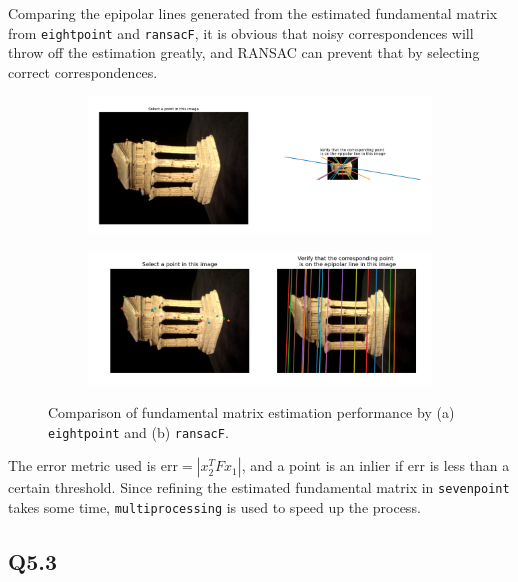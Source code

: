 \documentclass{article} %
\begin{document}
    Comparing the epipolar lines generated from the estimated fundamental matrix from \verb|eightpoint| and \verb|ransacF|, it is obvious that noisy correspondences will throw off the estimation greatly, and RANSAC can prevent that by selecting correct correspondences.
    \smallskip

    \begin{figure}[h]
        \begin{subfigure}[b]{0.5\textwidth}
            \includegraphics[width=\textwidth]{q5,1 eightpoint.png}
            \subcaption{}
        \end{subfigure}
        \begin{subfigure}[b]{0.5\textwidth}
            \includegraphics[width=\textwidth]{q5,1 ransac.png}
            \subcaption{}
        \end{subfigure}
        \caption{Comparison of fundamental matrix estimation performance by (a) \texttt{eightpoint} and (b) \texttt{ransacF}.}
    \end{figure}
    
    The error metric used is $\text{err}=|x_2^TFx_1|$, and a point is an inlier if $\text{err}$ is less than a certain threshold. Since refining the estimated fundamental matrix in \verb|sevenpoint| takes some time, \verb|multiprocessing| is used to speed up the process.

    \subsection*{Q5.3}
\end{document}
